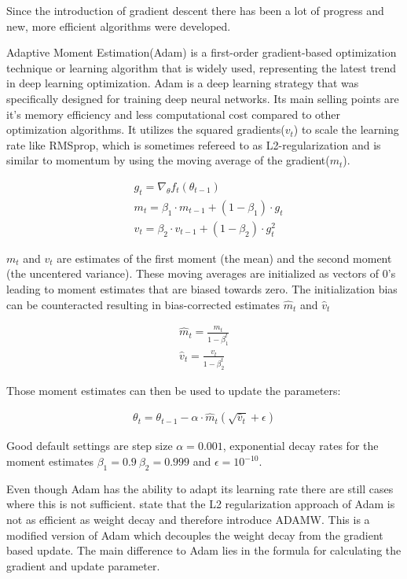 \documentclass[
a4paper, 
12pt,
grayscalebody, %
abstract=on,
twoside, BCOR10mm, 12pt, DIV13,headinclude, footexclude, final, abstracton, openright
]{ibireprt}
\numberwithin{equation}{chapter}
\numberwithin{table}{chapter}
\numberwithin{figure}{chapter}
\numberwithin{algorithm}{chapter}
\numberwithin{example}{chapter}
\numberwithin{example}{chapter}
\begin{document}
Since the introduction of gradient descent there has been a lot of progress and new, more efficient algorithms were developed. 

Adaptive Moment Estimation(Adam)\cite{Kingma2014} is a first-order gradient-based optimization technique or learning algorithm that is widely used, representing the latest trend in deep learning optimization. Adam is a deep learning strategy that was specifically designed for training deep neural networks. Its main selling points are it's memory efficiency and less computational cost compared to other optimization algorithms. 
It  utilizes the squared gradients($v_t$) to scale the learning rate like RMSprop, which is sometimes refereed to as L2-regularization and is similar to momentum by using the moving average of the gradient($m_t$).


\begin{align}
	& g_t = \nabla_\theta f_t(\theta_{t-1})\\
	& m_t =\beta_1\cdot m_{t-1} + (1- \beta_1)\cdot g_t \\
	& v_t =\beta_2\cdot v_{t-1} + (1- \beta_2)\cdot g_t^2
\end{align}

$m_t$ and $v_t$ are estimates of the first moment (the mean) and the second moment (the uncentered
variance). These moving averages are initialized as vectors of 0's leading to moment estimates that are  biased towards zero. The initialization bias can be counteracted resulting in bias-corrected estimates $\hat{m}_t$ and $\hat{v}_t$

\begin{align}
	\hat{m}_t =\frac{m_t}{1- \beta_1^t} \\
	\hat{v}_t = \frac{v_t}{1- \beta_2^t}
\end{align}

Those moment estimates can then be used to update the parameters: 

\begin{align}
	\theta_t = \theta_{t-1}-\alpha\cdot\hat{m}_t(\sqrt{\hat{v}_t}+\epsilon)
\end{align}

Good default settings are step size $\alpha = 0.001$, exponential decay rates for the moment estimates $\beta_1 = 0.9\ \beta_2 = 0.999 $ and $\epsilon =  10^{-10}$.



Even though Adam has the ability to adapt its learning rate there are still cases where this is not sufficient. \cite{Loshchilov2017} state that the L2 regularization approach of Adam is not as efficient as weight decay and therefore introduce ADAMW. This is a modified version of Adam which decouples the weight decay from the gradient based update. The main difference to Adam lies in the formula for calculating the gradient and update parameter. 
\end{document}
